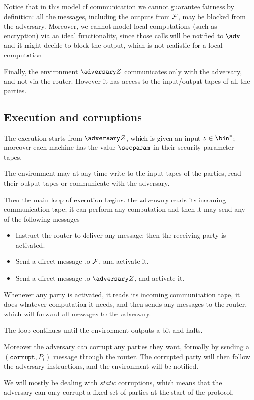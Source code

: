 Notice that in this model of communication we cannot guarantee fairness by definition: all the messages, including the outputs from $\mathcal{F}$, may be blocked from the adversary. Moreover, we cannot model local computations (such as encryption) via an ideal functionality, since those calls will be notified to $\adv$ and it might decide to block the output, which is not realistic for a local computation.

Finally, the environment $\zdv$ communicates only with the adversary, and not via the router. However it has access to the input/output tapes of all the parties.

\subsection{Execution and corruptions}

The execution starts from $\zdv$, which is given an input $z\in\bin^\ast$; moreover each machine has the value $\secparam$ in their security parameter tapes.

The environment may at any time write to the input tapes of the parties, read their output tapes or communicate with the adversary.

Then the main loop of execution begins: the adversary reads its incoming communication tape; it can perform any computation and then it may send any of the following messages
\begin{itemize}
    \item Instruct the router to deliver any message; then the receiving party is activated.
    \item Send a direct message to $\mathcal{F}$, and activate it.
    \item Send a direct message to $\zdv$, and activate it.
\end{itemize}

Whenever any party is activated, it reads its incoming communication tape, it does whatever computation it needs, and then sends any messages to the router, which will forward all messages to the adversary.

The loop continues until the environment outputs a bit and halts.

Moreover the adversary can corrupt any parties they want, formally by sending a $(\texttt{corrupt}, P_i)$ message through the router. The corrupted party will then follow the adversary instructions, and the environment will be notified.

We will mostly be dealing with \emph{static} corruptions, which means that the adversary can only corrupt a fixed set of parties at the start of the protocol.

